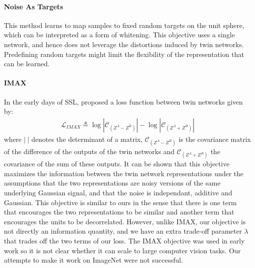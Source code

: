\paragraph{Noise As Targets} This method \cite{bojanowski2017unsupervised} learns to map samples to fixed random targets on the unit sphere, which can be interpreted as a form of whitening. This objective uses a single network, and hence does not leverage the distortions induced by twin networks. Predefining random targets might limit the flexibility of the representation that can be learned.



\paragraph{IMAX}

In the early days of SSL, \cite{becker_self-organizing_1992,zemel_discovering_1990} proposed a loss function between twin networks given by:
\begin{align*}
\mathcal{L}_{IMAX} \triangleq   \log |\mathcal{C}_{(Z^A-Z^B)}|-\log |\mathcal{C}_{(Z^A+Z^B)}|
\end{align*}
where $|~|$ denotes the determinant of a matrix, $\mathcal{C}_{(Z^A-Z^B)}$ is the covariance matrix of the difference of the outputs of the twin networks and  $\mathcal{C}_{(Z^A+Z^B)}$ the covariance of the sum of these outputs. It can be shown that this objective maximizes the information between the twin network representations under the assumptions that the two representations are noisy versions of the same underlying Gaussian signal, and that the noise is independant, additive and Gaussian. This objective is similar to ours in the sense that there is one term that encourages the two representations to be similar and another term that encourages the units to be decorrelated. However, unlike \textsc{IMAX}, our objective is not directly an information quantity, and we have an extra trade-off parameter $\lambda$ that trades off the two terms of our loss. The \textsc{IMAX} objective was used in early work so it is not clear whether it can scale to large computer vision tasks. Our attempts to make it work on ImageNet were not successful.




